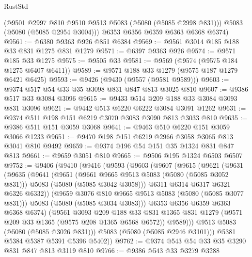 \begin{lexlean}{RustStd}
\begin{coremodule}
        (@9501 @2997 @810 @9510 @9513 @5083 (@5080 (@5085 @2998 @831)))
        @5083
        (@5080 (@5085 @2954 @3004)))
      @6353
      @6356
      @6359
      @6363
      @6368
      @6374)
@9561 := @6380 @9363 @926 @851 @6384
@9569 := @9561 @3014 @185 @188 @33 @831 @1275 @831 @1279
@9571 := @6397 @9363 @926
@9574 := @9571 @185 @33 @1275
@9575 := @9505 @33
@9581 := @9569 (@9574 (@9575 @184 @1275 @6407 @6411))
@9589 := @9571 @188 @33 @1279 (@9575 @187 @1279 @6421 @6425)
@9593 := @9426 (@9430 (@9557 (@9581 @9589)))
@9603 := @9374 @517 @54 @33 @35 @3098 @831 @847 @813 @3025 @810
@9607 := @9386 @517 @33 @3084 @3096
@9615 := @9433 @514 @209 @188 @33 @3084 @3093 @831 @3096
@9621 := @9442 @513 @6220 @6222 @3084 @3091 @1262
@9631 := @9374 @511 @198 @151 @6219 @3070 @3083 @3090 @813 @3033 @810
@9635 := @9386 @511 @151 @3059 @3068
@9641 := @9463 @510 @6220 @151 @3059 @3066 @1233
@9651 := @9470 @198 @151 @6219 @2966 @3058 @3065 @813 @3041 @810 @9492
@9659 := @9374 @196 @54 @151 @35 @1324 @831 @847 @813
@9661 := @9659 @3051 @810
@9665 := @9506 @195 @1324 @6503 @6507
@9752 := @9406
    (@9410
      (@9416
        (@9593
          (@9603
            (@9607
              (@9615
                (@9621
                  (@9631
                    (@9635
                      (@9641
                        (@9651
                          (@9661 @9665 @9513 @5083 (@5080 (@5085 @3052 @831)))
                          @5083
                          (@5080 (@5085 @3042 @3058)))
                        @6311
                        @6314
                        @6317
                        @6321
                        @6326
                        @6332))
                    (@9659 @3076 @810 @9665 @9513 @5083 (@5080 (@5085 @3077 @831)))
                    @5083
                    (@5080 (@5085 @3034 @3083)))
                  @6353
                  @6356
                  @6359
                  @6363
                  @6368
                  @6374)
                (@9561
                  @3093
                  @209
                  @188
                  @33
                  @831
                  @1365
                  @831
                  @1279
                  (@9571 @209 @33 @1365 (@9575 @208 @1365 @6568 @6572))
                  @9589)))
            @9513
            @5083
            (@5080 (@5085 @3026 @831)))
          @5083
          (@5080 (@5085 @2946 @3101)))
        @5381
        @5384
        @5387
        @5391
        @5396
        @5402))
@9762 := @9374 @543 @54 @33 @35 @3290 @831 @847 @813 @3119 @810
@9766 := @9386 @543 @33 @3279 @3288

\end{coremodule}
\end{lexlean}
